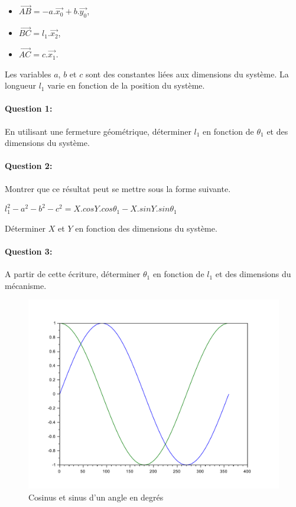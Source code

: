 \begin{minipage}{0.45\linewidth}
\begin{itemize}
 \item $\overrightarrow{AB}=-a.\overrightarrow{x_0}+b.\overrightarrow{y_0}$,
 \item $\overrightarrow{BC}=l_1.\overrightarrow{x_2}$,
 \item $\overrightarrow{AC}=c.\overrightarrow{x_1}$. 
\end{itemize}
\end{minipage}\hfill
\begin{minipage}{0.45\linewidth}
Les variables $a$, $b$ et $c$ sont des constantes liées aux dimensions du système. La longueur $l_1$ varie en fonction de la position du système.
\end{minipage}

\paragraph{Question 1:} En utilisant une fermeture géométrique, déterminer $l_1$ en fonction de $\theta_1$ et des dimensions du système.

\paragraph{Question 2:} Montrer que ce résultat peut se mettre sous la forme suivante.

\begin{center}
$l_1^2-a^2-b^2-c^2=X.cos Y.cos\theta_1-X.sin Y.sin\theta_1$
\end{center}

Déterminer $X$ et $Y$ en fonction des dimensions du système.

\paragraph{Question 3:} A partir de cette écriture, déterminer $\theta_1$ en fonction de $l_1$ et des dimensions du mécanisme.

\newpage

\begin{figure}[!h]
	\begin{center}
	\includegraphics[width=0.7\linewidth]{img/Degres}
	\end{center}
	\caption{Cosinus et sinus d'un angle en degrés}
\end{figure}

